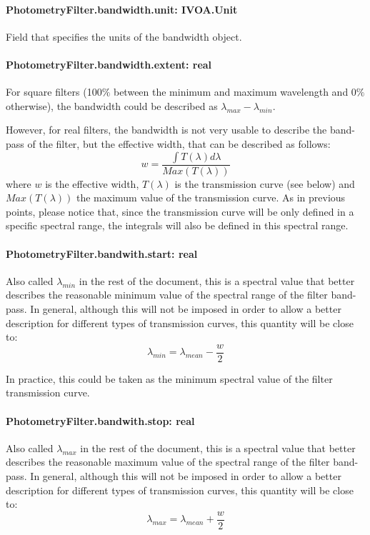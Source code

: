 \documentclass[11pt,a4paper]{ivoa}
\begin{document}
\paragraph{PhotometryFilter.bandwidth.unit: IVOA.Unit}
Field that specifies the units of the bandwidth object.
\par

\paragraph{PhotometryFilter.bandwidth.extent: real}
For square filters (100$\%$  between the minimum and maximum wavelength and 0$\%$  otherwise),
the bandwidth could be described as $\lambda_{max} - \lambda_{min}$.
\par

However, for real filters, the bandwidth is not very usable to describe the band-pass of the
filter, but the effective width, that can be described as follows:
\begin{equation} \label{eq:21}
w = \frac{\int T(\lambda)d\lambda}{Max(T(\lambda))}
\end{equation}
where $w$ is the effective width, $T(\lambda)$ is the transmission curve (see below)
and $Max(T(\lambda))$ the maximum value of the transmission curve. As in previous points,
please notice that, since the transmission curve will be only defined in a specific spectral
range, the integrals will also be defined in this spectral range.
\par

\paragraph{PhotometryFilter.bandwith.start: real}
Also called $\lambda_{min}$ in the rest of the document, this is a spectral value that better describes
the reasonable minimum value of the spectral range of the filter band-pass. In general,
although this
will not be imposed in order to allow a better description for different types of
transmission curves, this quantity will be close to:
\begin{equation} \label{eq:22}
\lambda_{min} = \lambda_{mean} - \frac{w}{2}
\end{equation}

In practice, this could be taken as the minimum spectral value of the filter transmission curve.
\par

\paragraph{PhotometryFilter.bandwith.stop: real}
Also called $\lambda_{max}$ in the rest of the document, this is a spectral value that
better describes the reasonable maximum value of the spectral range of the filter band-pass.
In general,
although this will not be imposed in order to allow a better description for different
types of transmission curves, this quantity will be close to:
\begin{equation} \label{eq:23}
\lambda_{max} = \lambda_{mean} + \frac{w}{2}
\end{equation}
\end{document}
